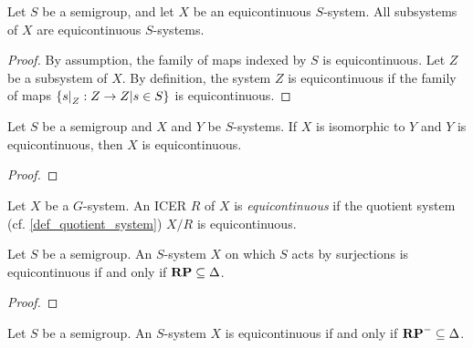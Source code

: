 \begin{lemma}
    \label{lemma_subsys_of_equi_is_equi}
    \leanok{}
    Let $S$ be a semigroup, and let $X$ be an equicontinuous $S$-system.  All subsystems of $X$ are equicontinuous $S$-systems.
\end{lemma}

\begin{proof}
\leanok{}
    By assumption, the family of maps indexed by $S$ is equicontinuous.  Let $Z$ be a subsystem of $X$.  By definition, the system $Z$ is equicontinuous if the family of maps $\{\restr{s}{Z}: Z \to Z | s \in S\}$ is equicontinuous.  
\end{proof}


\begin{theorem}
    \label{thm_isom_to_equi_is_equi}
    Let $S$ be a semigroup and $X$ and $Y$ be $S$-systems.  If $X$ is isomorphic to $Y$ and $Y$ is equicontinuous, then $X$ is equicontinuous.
\end{theorem}

\begin{proof}
\end{proof}


\begin{definition}
\leanok{}
    Let $X$ be a $G$-system.  An ICER $R$ of $X$ is \emph{equicontinuous} if the quotient system (cf. \cref{def_quotient_system}) $X/R$ is equicontinuous.
\end{definition}

\begin{lemma}
    \label{lemma_rp_and_equicontinuity}
    \leanok{}
    Let $S$ be a semigroup. An $S$-system $X$ on which $S$ acts by surjections is equicontinuous if and only if $\mathbf{RP} \subseteq \Delta$.
\end{lemma}

\begin{proof}
\end{proof}

\begin{lemma}
    \label{lemma_rp_and_equicontinuity}
    \leanok{}
    Let $S$ be a semigroup. An $S$-system $X$ is equicontinuous if and only if $\mathbf{RP}^- \subseteq \Delta$.
\end{lemma}

